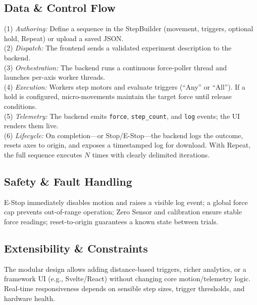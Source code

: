 \documentclass[
    twocolumn,
    fontsize = 10pt,
    parskip = half+,
    headings = small,
    headwidth = text,
    footwidth = text,
]{scrartcl}
\begin{document}
\subsection{Data \& Control Flow}
(1) \emph{Authoring:} Define a sequence in the StepBuilder (movement, triggers, optional hold, Repeat) or upload a saved JSON.\\

(2) \emph{Dispatch:} The frontend sends a validated experiment description to the backend.\\

(3) \emph{Orchestration:} The backend runs a continuous force-poller thread and launches per-axis worker threads.\\

(4) \emph{Execution:} Workers step motors and evaluate triggers (``Any'' or ``All''). If a hold is configured, micro-movements maintain the target force until release conditions.\\

(5) \emph{Telemetry:} The backend emits \texttt{force}, \texttt{step\_count}, and \texttt{log} events; the UI renders them live.\\

(6) \emph{Lifecycle:} On completion—or Stop/E-Stop—the backend logs the outcome, resets axes to origin, and exposes a timestamped log for download. With Repeat, the full sequence executes $N$ times with clearly delimited iterations.

\subsection{Safety \& Fault Handling}
E-Stop immediately disables motion and raises a visible log event; a global force cap prevents out-of-range operation; Zero Sensor and calibration ensure stable force readings; reset-to-origin guarantees a known state between trials.

\subsection{Extensibility \& Constraints}
The modular design allows adding distance-based triggers, richer analytics, or a framework UI (e.g., Svelte/React) without changing core motion/telemetry logic. Real-time responsiveness depends on sensible step sizes, trigger thresholds, and hardware health.

\end{document}
